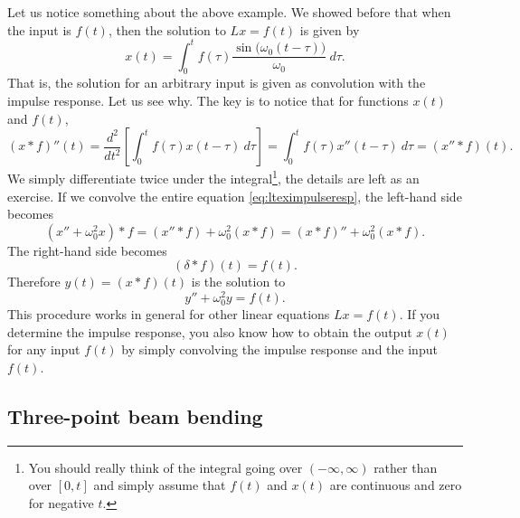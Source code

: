 Let us notice something about the above example.  We showed before that
when the input is $f(t)$, then the solution to $Lx = f(t)$
is given by
\begin{equation*}
x(t) = 
\int_0^t
f(\tau) 
\frac{\sin \bigl( \omega_0 (t-\tau) \bigr)}{\omega_0} ~ d\tau .
\end{equation*}
That is, the solution for an arbitrary input is given as
convolution with the impulse response.  Let us see why.
The key is to notice that for functions $x(t)$ and $f(t)$,
\begin{equation*}
(x * f)''(t) =
\frac{d^2}{dt^2}\left[
\int_0^t
f(\tau) 
x(t-\tau) ~ d\tau \right]
=
\int_0^t
f(\tau) 
x''(t-\tau) ~ d\tau
= (x'' * f)(t) .
\end{equation*}
We simply differentiate twice under the
integral\footnote{You should really think of the integral going over
$(-\infty,\infty)$ rather than over $[0,t]$ and simply assume that $f(t)$ and
$x(t)$ are continuous and zero for negative $t$.}, the details are
left as an exercise.
If we convolve the entire equation \eqref{eq:lteximpulseresp},
the left-hand side becomes
\begin{equation*}
(x'' + \omega_0^2 x) * f =
(x'' * f) + \omega_0^2 (x * f) =
(x * f)'' + \omega_0^2 (x * f) .
\end{equation*}
The right-hand side becomes
\begin{equation*}
(\delta * f)(t) = f(t).
\end{equation*}
Therefore $y(t) = (x * f)(t)$ is the solution to
\begin{equation*}
y'' + \omega_0^2 y = f(t) .
\end{equation*}
This procedure works in general for other linear
equations $Lx = f(t)$.  If you determine the impulse response,
you also know how to obtain the output $x(t)$ for any input $f(t)$
by simply convolving
the impulse response and the input $f(t)$.

\subsection{Three-point beam bending}

